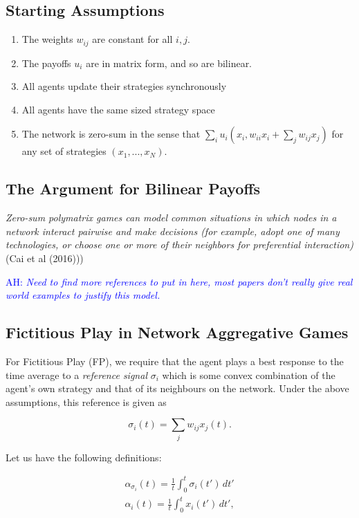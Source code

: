 \documentclass{article}
\theoremstyle{definition}
\newcommand{\ah}[1]{\textcolor{blue}{AH: \textit{#1}}}
\begin{document}
	\subsection*{Starting Assumptions}
	
	\begin{enumerate}[I]
		\item The weights $w_{ij}$ are constant for all $i, j$.
		\item The payoffs $u_i$ are in matrix form, and so are bilinear.
		\item All agents update their strategies synchronously
		\item All agents have the same sized strategy space 
		\item The network is zero-sum in the sense that $\sum_i u_i(x_i, w_{ii} x_i + \sum_{j} w_{ij} x_j)$ for any set of strategies $(x_1, ..., x_N)$. 
	\end{enumerate}
	
	\subsection*{The Argument for Bilinear Payoffs}
	
	\textit{Zero-sum polymatrix games can model common situations in which nodes in a network interact pairwise and make decisions (for example, adopt one of many technologies, or choose one or more of their neighbors for preferential interaction)} (Cai et al (2016)))
	
	\ah{Need to find more references to put in here, most papers don't really give real world examples to justify this model.}
	
	\subsection*{Fictitious Play in Network Aggregative Games}
	
	For Fictitious Play (FP), we require that the agent plays a best response to the time average to a \emph{reference signal} $\sigma_i$ which is some convex combination of the agent's own strategy and that of its neighbours on the network. Under the above assumptions, this reference is given as
	
	\begin{equation*}
		\sigma_i (t) = \sum_{j} w_{ij} x_j (t).
	\end{equation*}
	
	Let us have the following definitions:
	
	\begin{align}
		\alpha_{\sigma_i}(t) = \frac{1}{t} \int_{0}^{t} \sigma_i(t') \, dt'\nonumber \\
		\alpha_i(t) = \frac{1}{t} \int_{0}^{t} x_i(t') \, dt', \nonumber
	\end{align}
	
\end{document}

